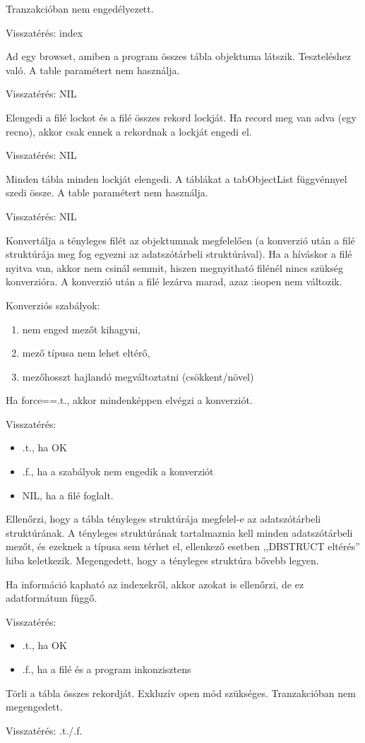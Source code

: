 Tranzakcióban nem engedélyezett.
 
Visszatérés: index

Ad egy browset, 
amiben a program összes tábla objektuma látszik.
Teszteléshez való. A table paramétert nem használja.

Visszatérés: NIL

Elengedi a filé lockot és a filé összes rekord lockját.
Ha record meg van adva (egy recno), akkor csak ennek 
a rekordnak a lockját engedi el.

Visszatérés: NIL
 
Minden tábla minden lockját elengedi. 
A táblákat a tabObjectList függvénnyel szedi össze.
A table paramétert nem használja.

Visszatérés: NIL
 
Konvertálja a tényleges filét az objektumnak megfelelően
(a konverzió után a filé struktúrája meg fog egyezni
az adatszótárbeli struktúrával).
Ha a híváskor a filé nyitva van, akkor nem csinál semmit,
hiszen megnyitható filénél nincs szükség konverzióra.
A konverzió után a filé lezárva marad, azaz :isopen nem változik.

Konverziós szabályok:
\begin{enumerate}
\item nem enged mezőt kihagyni,
\item mező típusa nem lehet eltérő,
\item mezőhosszt hajlandó megváltoztatni (csökkent/növel)
\end{enumerate}
Ha force==.t., akkor mindenképpen elvégzi a konverziót.

Visszatérés:
\begin{itemize}
\item .t., ha OK 
\item .f., ha a szabályok nem engedik a konverziót 
\item NIL, ha a filé foglalt.
\end{itemize}
 

Ellenőrzi, hogy a tábla tényleges struktúrája
megfelel-e az adatszótárbeli struktúrának.
A tényleges struktúrának tartalmaznia kell 
minden adatszótárbeli mezőt, és ezeknek
a típusa sem térhet el, ellenkező esetben
,,DBSTRUCT eltérés'' hiba keletkezik.
Megengedett, hogy a tényleges struktúra
bővebb legyen.

Ha információ kapható az indexekről,
akkor azokat is ellenőrzi, de ez adatformátum függő.
           
Visszatérés:
\begin{itemize}
\item .t., ha OK 
\item .f., ha a filé és a program inkonzisztens 
\end{itemize}
        
Törli a tábla összes rekordját. 
Exkluzív open mód szükséges.
Tranzakcióban nem megengedett.

Visszatérés: .t./.f.
 


